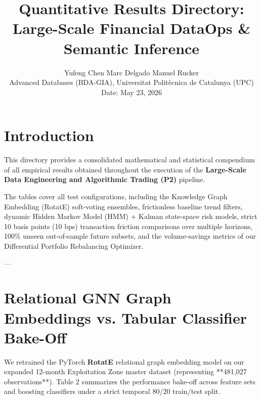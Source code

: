 \documentclass[11pt,article]{article}
\begin{document}
\title{\textbf{Quantitative Results Directory: Large-Scale Financial DataOps \& Semantic Inference}}
\author{Yufeng Chen \quad Marc Delgado \quad Manuel Rucker\\
\small{Advanced Databases (BDA-GIA), Universitat Polit\`ecnica de Catalunya (UPC)}\\
\small{Date: May 23, 2026}}
\date{}

\maketitle

\section{Introduction}
This directory provides a consolidated mathematical and statistical compendium of all empirical results obtained throughout the execution of the \textbf{Large-Scale Data Engineering and Algorithmic Trading (P2)} pipeline.

The tables cover all test configurations, including the Knowledge Graph Embedding (RotatE) soft-voting ensembles, frictionless baseline trend filters, dynamic Hidden Markov Model (HMM) + Kalman state-space risk models, strict 10 basis points (10 bps) transaction friction comparisons over multiple horizons, 100\% unseen out-of-sample future subsets, and the volume-savings metrics of our Differential Portfolio Rebalancing Optimizer.

---

\section{Relational GNN Graph Embeddings vs. Tabular Classifier Bake-Off}
We retrained the PyTorch \textbf{RotatE} relational graph embedding model on our expanded 12-month Exploitation Zone master dataset (representing **481,027 observations**). Table 2 summarizes the performance bake-off across feature sets and boosting classifiers under a strict temporal 80/20 train/test split.
\end{document}

